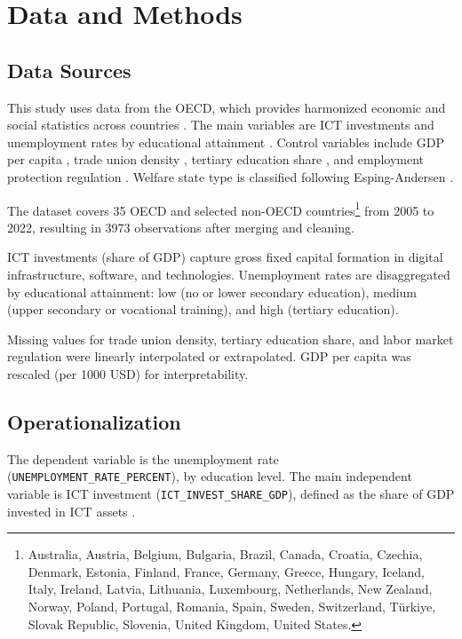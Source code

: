 
\section{Data and Methods}

\subsection{Data Sources}

This study uses data from the OECD, which provides harmonized economic and social statistics 
across countries \parencite{oecd2025}. The main variables are ICT investments 
\parencite{oecd2022ict} and unemployment rates by educational attainment 
\parencite{oecd2022unemployment}. Control variables include GDP per capita 
\parencite{oecd2022gdp}, trade union density \parencite{oecd2022tud}, tertiary education share 
\parencite{oecd2022education}, and employment protection regulation 
\parencite{oecd2022regulation}. Welfare state type is classified following Esping-Andersen 
\parencite{espingandersen1990thethree}.

The dataset covers 35 OECD and selected non-OECD countries\footnote{Australia, Austria, Belgium, 
Bulgaria, Brazil, Canada, Croatia, Czechia, Denmark, Estonia, Finland, France, Germany, Greece, 
Hungary, Iceland, Italy, Ireland, Latvia, Lithuania, Luxembourg, Netherlands, New Zealand, 
Norway, Poland, Portugal, Romania, Spain, Sweden, Switzerland, Türkiye, Slovak Republic, 
Slovenia, United Kingdom, United States.} from 2005 to 2022, resulting in 3973 observations after 
merging and cleaning.

ICT investments (share of GDP) capture gross fixed capital formation in digital infrastructure, 
software, and technologies. Unemployment rates are disaggregated by educational attainment: low 
(no or lower secondary education), medium (upper secondary or vocational training), and high 
(tertiary education).

Missing values for trade union density, tertiary education share, and labor market regulation 
were linearly interpolated or extrapolated. GDP per capita was rescaled (per 1000 USD) for 
interpretability.

\subsection{Operationalization}

The dependent variable is the unemployment rate (\texttt{UNEMPLOYMENT\_RATE\_PERCENT}), by 
education level. The main independent variable is ICT investment 
(\texttt{ICT\_INVEST\_SHARE\_GDP}), defined as the share of GDP invested in ICT assets 
\parencite{oecd2022ict}.


